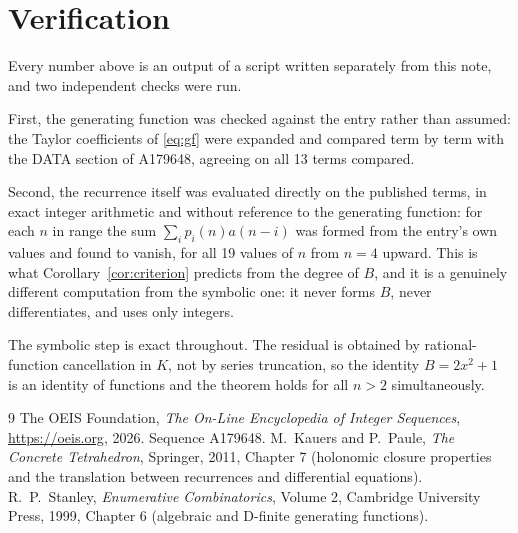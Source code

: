 \documentclass[11pt,a4paper]{article}
\theoremstyle{plain}
\theoremstyle{definition}
\begin{document}
\section{Verification}

Every number above is an output of a script written separately from this note, and two
independent checks were run.

First, the generating function was checked against the entry rather than assumed: the
Taylor coefficients of \eqref{eq:gf} were expanded and compared term by term with the DATA
section of A179648, agreeing on all 13 terms compared.

Second, the recurrence itself was evaluated directly on the published terms, in exact
integer arithmetic and without reference to the generating function: for each $n$ in range
the sum $\sum_{i}p_{i}(n)a(n-i)$ was formed from the entry's own values and found to
vanish, for all 19 values of $n$ from $n=4$ upward. This is what
Corollary~\ref{cor:criterion} predicts from the degree of $B$, and it is a genuinely
different computation from the symbolic one: it never forms $B$, never differentiates, and
uses only integers.

The symbolic step is exact throughout. The residual is obtained by rational-function
cancellation in $K$, not by series truncation, so the identity $B=2 x^{2} + 1$ is an
identity of functions and the theorem holds for all $n>2$ simultaneously.

\begin{thebibliography}{9}
 The OEIS Foundation, \emph{The On-Line Encyclopedia of Integer Sequences},
\url{https://oeis.org}, 2026. Sequence A179648.
 M.~Kauers and P.~Paule, \emph{The Concrete Tetrahedron}, Springer, 2011,
Chapter 7 (holonomic closure properties and the translation between recurrences and
differential equations).
 R.~P.~Stanley, \emph{Enumerative Combinatorics}, Volume 2, Cambridge
University Press, 1999, Chapter 6 (algebraic and D-finite generating functions).
\end{thebibliography}
\end{document}
